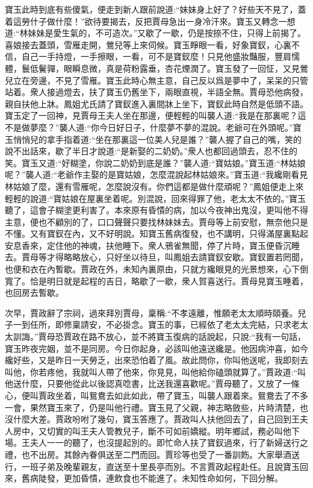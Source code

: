 \begin{parag}
    寶玉此時到底有些傻氣，便走到新人跟前說道:“妹妹身上好了？好些天不見了，蓋着這勞什子做什麼！”欲待要揭去，反把賈母急出一身冷汗來。寶玉又轉念一想道:“林妹妹是愛生氣的，不可造次。”又歇了一歇，仍是按捺不住，只得上前揭了。喜娘接去蓋頭，雪雁走開，鶯兒等上來伺候。寶玉睜眼一看，好象寶釵，心裏不信，自己一手持燈，一手擦眼，一看，可不是寶釵麼！只見他盛妝豔服，豐肩懦體，鬟低鬢嚲，眼瞬息微，真是荷粉露垂，杏花煙潤了。寶玉發了一回怔，又見鶯兒立在旁邊，不見了雪雁。寶玉此時心無主意，自己反以爲是夢中了，呆呆的只管站着。衆人接過燈去，扶了寶玉仍舊坐下，兩眼直視，半語全無。賈母恐他病發，親自扶他上牀。鳳姐尤氏請了寶釵進入裏間牀上坐下，寶釵此時自然是低頭不語。寶玉定了一回神，見賈母王夫人坐在那邊，便輕輕的叫襲人道:“我是在那裏呢？這不是做夢麼？”襲人道:“你今日好日子，什麼夢不夢的混說。老爺可在外頭呢。”寶玉悄悄兒的拿手指着道:“坐在那裏這一位美人兒是誰？”襲人握了自己的嘴，笑的說不出話來，歇了半日才說道:“是新娶的二奶奶。”衆人也都回過頭去，忍不住的笑。寶玉又道:“好糊塗，你說二奶奶到底是誰？”襲人道:“寶姑娘。”寶玉道:“林姑娘呢？”襲人道:“老爺作主娶的是寶姑娘，怎麼混說起林姑娘來。”寶玉道:“我纔剛看見林姑娘了麼，還有雪雁呢，怎麼說沒有。你們這都是做什麼頑呢？”鳳姐便走上來輕輕的說道:“寶姑娘在屋裏坐着呢。別混說，回來得罪了他，老太太不依的。”寶玉聽了，這會子糊塗更利害了。本來原有昏憒的病，加以今夜神出鬼沒，更叫他不得主意，便也不顧別的了，口口聲聲只要找林妹妹去。賈母等上前安慰，無奈他只是不懂。又有寶釵在內，又不好明說。知寶玉舊病復發，也不講明，只得滿屋裏點起安息香來，定住他的神魂，扶他睡下。衆人鴉雀無聞，停了片時，寶玉便昏沉睡去。賈母等才得略略放心，只好坐以待旦，叫鳳姐去請寶釵安歇。寶釵置若罔聞，也便和衣在內暫歇。賈政在外，未知內裏原由，只就方纔眼見的光景想來，心下倒寬了。恰是明日就是起程的吉日，略歇了一歇，衆人賀喜送行。賈母見寶玉睡着，也回房去暫歇。
\end{parag}


\begin{parag}
    次早，賈政辭了宗祠，過來拜別賈母，稟稱:“不孝遠離，惟願老太太順時頤養。兒子一到任所，即修稟請安，不必掛念。寶玉的事，已經依了老太太完結，只求老太太訓誨。”賈母恐賈政在路不放心，並不將寶玉復病的話說起，只說:“我有一句話，寶玉昨夜完姻，並不是同房。今日你起身，必該叫他遠送纔是。他因病沖喜，如今纔好些，又是昨日一天勞乏，出來恐怕着了風。故此問你，你叫他送呢，我即刻去叫他，你若疼他，我就叫人帶了他來，你見見，叫他給你磕頭就算了。”賈政道:“叫他送什麼，只要他從此以後認真唸書，比送我還喜歡呢。”賈母聽了，又放了一條心，便叫賈政坐着，叫鴛鴦去如此如此，帶了寶玉，叫襲人跟着來。鴛鴦去了不多一會，果然寶玉來了，仍是叫他行禮。寶玉見了父親，神志略斂些，片時清楚，也沒什麼大差。賈政吩咐了幾句，寶玉答應了。賈政叫人扶他回去了，自己回到王夫人房中，又切實的叫王夫人管教兒子，斷不可如前嬌縱。明年鄉試，務必叫他下場。王夫人一一的聽了，也沒提起別的。即忙命人扶了寶釵過來，行了新婦送行之禮，也不出房。其餘內眷俱送至二門而回。賈珍等也受了一番訓飭。大家舉酒送行，一班子弟及晚輩親友，直送至十里長亭而別。不言賈政起程赴任。且說寶玉回來，舊病陡發，更加昏憒，連飲食也不能進了。未知性命如何，下回分解。
\end{parag}
